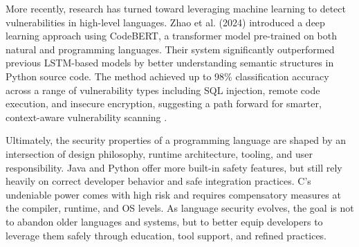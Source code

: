 \documentclass[conference]{IEEEtran}
\begin{document}
More recently, research has turned toward leveraging machine learning to detect vulnerabilities in high-level languages. Zhao et al. (2024) introduced a deep learning approach using CodeBERT, a transformer model pre-trained on both natural and programming languages. Their system significantly outperformed previous LSTM-based models by better understanding semantic structures in Python source code. The method achieved up to 98\% classification accuracy across a range of vulnerability types including SQL injection, remote code execution, and insecure encryption, suggesting a path forward for smarter, context-aware vulnerability scanning \cite{Zhao2024}.

Ultimately, the security properties of a programming language are shaped by an intersection of design philosophy, runtime architecture, tooling, and user responsibility. Java and Python offer more built-in safety features, but still rely heavily on correct developer behavior and safe integration practices. C’s undeniable power comes with high risk and requires compensatory measures at the compiler, runtime, and OS levels. As language security evolves, the goal is not to abandon older languages and systems, but to better equip developers to leverage them safely through education, tool support, and refined practices.





\end{document}
